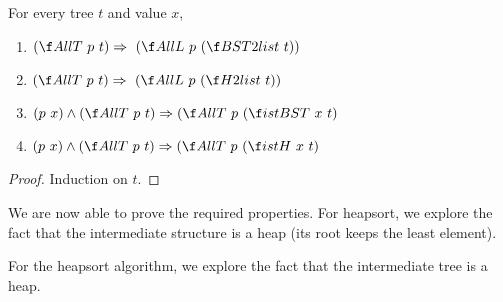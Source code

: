 \documentclass[a4paper,11pt]{llncs}
\begin{document}
\begin{lemma}
\label{lemma:allT-props}
For every tree $t$ and value $x$,
  \begin{enumerate}
  \item $(\AllT\ p\ t) \Rightarrow\ (\AllL\ p\ (\BST2list\ t))$
  \item $(\AllT\ p\ t) \Rightarrow\ (\AllL\ p\ (\H2list\ t))$
  \item $(p\ x) \wedge (\AllT\ p\ t) \Rightarrow (\AllT\ p\ (\istBST\ x\
    t)$
  \item $(p\ x) \wedge (\AllT\ p\ t) \Rightarrow (\AllT\ p\ (\istH\ x\
    t)$
  \end{enumerate}
\end{lemma}
\begin{proof}
  Induction on $t$.
\end{proof}

We are now able to prove the required properties. For heapsort, we
explore the fact that the intermediate structure is a heap (its root
keeps the least element).

For the heapsort algorithm, we explore the fact that the intermediate
tree is a heap.
\end{document}
